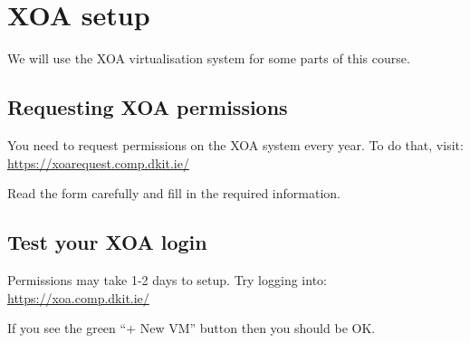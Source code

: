 \chapter{XOA setup}
\label{ch:xoa-setup}

We will use the XOA virtualisation system for some parts of this course.

\section{Requesting XOA permissions}
\label{sec:requesting-xoa-permissions}

You need to request permissions on the XOA system every year.
To do that, visit:\\
\url{https://xoarequest.comp.dkit.ie/}

Read the form carefully and fill in the required information.

\section{Test your XOA login}
\label{sec:test-your-xoa-login}

Permissions may take 1-2 days to setup.
Try logging into:\\
\url{https://xoa.comp.dkit.ie/}

If you see the green ``+ New VM'' button then you should be OK.

